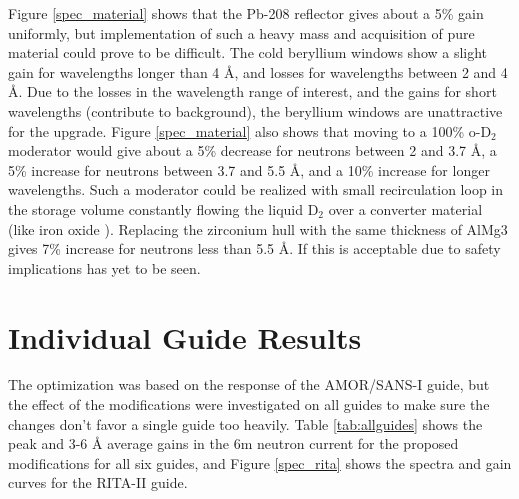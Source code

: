 \documentclass[a4paper]{jpconf}
\begin{document}
Figure \ref{spec_material} shows that the Pb-208 reflector gives about a 5\% gain uniformly, but implementation of such a heavy mass and acquisition of pure material could prove to be difficult.  The cold beryllium windows show a slight gain for wavelengths longer than 4 {\AA}, and losses for wavelengths between 2 and 4 {\AA}.  Due to the losses in the wavelength range of interest, and the gains for short wavelengths (contribute to background), the beryllium windows are unattractive for the upgrade.  Figure \ref{spec_material} also shows that moving to a 100\% o-D$_2$ moderator would give about a 5\% decrease for neutrons between 2 and 3.7 {\AA}, a 5\% increase for neutrons between 3.7 and 5.5 {\AA}, and a 10\% increase for longer wavelengths.  Such a moderator could be realized with small recirculation loop in the storage volume constantly flowing the liquid D$_2$ over a converter material (like iron oxide \cite{catalyst}).  Replacing the zirconium hull with the same thickness of AlMg3 gives 7\% increase for neutrons less than 5.5 {\AA}.  If this is acceptable due to safety implications has yet to be seen.

\section{Individual Guide Results}
\label{sec:allguides}

The optimization was based on the response of the AMOR/SANS-I guide, but the effect of the modifications were investigated on all guides to make sure the changes don't favor a single guide too heavily.  Table \ref{tab:allguides} shows the peak and 3-6 {\AA} average gains in the 6m neutron current for the proposed modifications for all six guides, and Figure \ref{spec_rita} shows the spectra and gain curves for the RITA-II guide.
\end{document}
